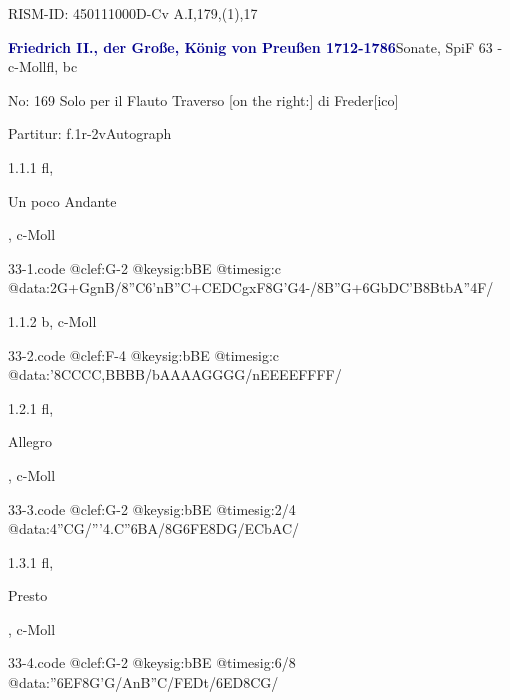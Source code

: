 \documentclass[a4paper, twocolumn, 11pt]{book}
\begin{document}
\par RISM-ID: 450111000\newline D-Cv  A.I,179,(1),17
\par \vspace{16pt} \textcolor{darkblue}{\textbf{Friedrich II., der Große, König von Preußen  1712-1786}}\hfillplus{[33]}\newline Sonate, SpiF 63 - c-Moll\newline fl, bc
\par \begin{itshape} No: 169 Solo per il Flauto Traverso [on the right:] di Freder[ico]\end{itshape} 
\par \textcolor{darkblue}{}  Partitur: f.1r-2v\newline Autograph
\par 1.1.1  fl, \begin{itshape}Un poco Andante\end{itshape}, c-Moll  
\begin{filecontents*}{33-1.code}
@clef:G-2
@keysig:bBE
@timesig:c
@data:2G+GgnB/{8''C6'nB''C}+{CEDC}gxF{8G'G}4-/8{B''G+}{6GbDC'B}{8BtbA}''4F/
\end{filecontents*}

\newline %
\par 1.1.2  b, c-Moll  
\begin{filecontents*}{33-2.code}
@clef:F-4
@keysig:bBE
@timesig:c
@data:'{8CCCC}{,BBBB}/{bAAAA}{GGGG}/{nEEEE}{FFFF}/
\end{filecontents*}

\newline %
\par 1.2.1  fl, \begin{itshape}Allegro\end{itshape}, c-Moll  
\begin{filecontents*}{33-3.code}
@clef:G-2
@keysig:bBE
@timesig:2/4
@data:4''CG/'''4.C''{6BA}/{8G6FE}{8DG}/{ECbAC}/
\end{filecontents*}

\newline %
\par 1.3.1  fl, \begin{itshape}Presto\end{itshape}, c-Moll  
\begin{filecontents*}{33-4.code}
@clef:G-2
@keysig:bBE
@timesig:6/8
@data:''{6EF8G'G}/{AnB''C}/{FEDt}/{6ED8CG}/
\end{filecontents*}
\end{document}
